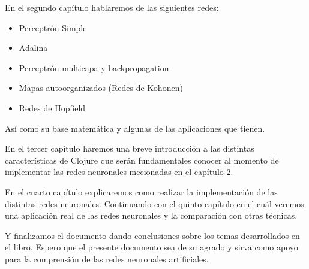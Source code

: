 \begin{prefacio}
  En el segundo capítulo hablaremos de las siguientes redes:

  \begin{itemize}
  \item Perceptrón Simple
  \item Adalina
  \item Perceptrón multicapa y backpropagation
  \item Mapas autoorganizados (Redes de Kohonen)
  \item Redes de Hopfield
  \end{itemize}

  Así como su base matemática y algunas de las aplicaciones que
  tienen.

  En el tercer capítulo haremos una breve introducción a las distintas
  características de Clojure que serán fundamentales conocer al
  momento de implementar las redes neuronales mecionadas en el
  capítulo 2.

  En el cuarto capítulo explicaremos como realizar la implementación
  de las distintas redes neuronales. Continuando con el quinto
  capítulo en el cuál veremos una aplicación real de las redes
  neuronales y la comparación con otras técnicas.

  Y finalizamos el documento dando conclusiones sobre los temas
  desarrollados en el libro. Espero que el presente documento sea de
  su agrado y sirva como apoyo para la comprensión de las redes
  neuronales artificiales.


\end{prefacio}